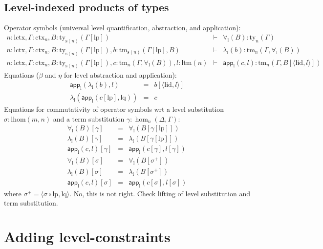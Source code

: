 \documentclass[11pt,a4paper]{article}
\theoremstyle{definition}
\newcommand{\app}[2]{{#1\,#2}} %
\def\lhom{\mathrm{lhom}}
\def\lctx{\mathrm{lctx}}
\def\ltm{\mathrm{ltm}}
\def\lp{\mathrm{lp}}
\def\lq{\mathrm{lq}}
\def\s{\mathrm{s}}
\def\lid{\mathrm{lid}}
\newcommand{\ctx}{\mathrm{ctx}}
\newcommand{\ty}{\mathrm{ty}}
\newcommand{\tm}{\mathrm{tm}}
\newcommand{\tuple}[1]{\langle #1 \rangle}
\def\p{\mathrm{p}}
\def\q{\mathrm{q}}
\def\app{\mathsf{app}}
\begin{document}

\subsection{Level-indexed products of types}
\def\l{\mathrm{l}}
Operator symbols (universal level quantification, abstraction, and application):
\begin{eqnarray*}
n : \lctx, \Gamma : \ctx_n, B : \ty_{\s(n)}(\Gamma[\lp])&\vdash& \forall_\l(B) : \ty_n(\Gamma)\\
n : \lctx, \Gamma : \ctx_n, B : \ty_{\s(n)}(\Gamma[\lp]), b : \tm_{\s(n)}(\Gamma[\lp], B) &\vdash& \lambda_\l(b) : \tm_n(\Gamma,\forall_\l(B))\\
n : \lctx, \Gamma : \ctx_n, B : \ty_{\s(n)}(\Gamma[\lp]), c :  \tm_n(\Gamma,\forall_\l(B)), l : \ltm(n) &\vdash& \app_\l(c,l) : \tm_n(\Gamma, B[\tuple{\lid,l}])
\end{eqnarray*}
Equations ($\beta$ and $\eta$ for level abstraction and application):
 \begin{eqnarray*}
 \app_\l(\lambda_\l(b),l) &=& b[\tuple{\lid,l}]\\
 \lambda_\l(\app_\l(c[\lp],\lq)) &=& c
 \end{eqnarray*}
 Equations for commutativity of operator symbols wrt a level substitution $\sigma : \lhom(m,n)$ and a term substitution $\gamma : \hom_n(\Delta,\Gamma)$:
 \begin{eqnarray*}
 \forall_\l(B)[ \gamma ] &=& \forall_\l(B[ \gamma[\lp]])\\
 \lambda_\l(B)[ \gamma ] &=& \lambda_\l(B[ \gamma[\lp]])\\
 \app_\l(c,l)[ \gamma ] &=& \app_\l(c[ \gamma ] ,l[ \gamma ] )\\
 \forall_\l(B)[ \sigma ] &=& \forall_\l(B[ \sigma^{+}])\\
 \lambda_\l(B)[ \sigma ] &=& \lambda_\l(B[ \sigma^{+}])\\
\app_\l(c,l)[ \sigma ] &=& \app_\l(c[ \sigma ] ,l[ \sigma ] )
\end{eqnarray*}
where $\sigma^+ = \tuple{\sigma \circ \lp, \lq}$. No, this is not right. Check lifting of level substitution and term substitution.

\section{Adding level-constraints}
\end{document}
